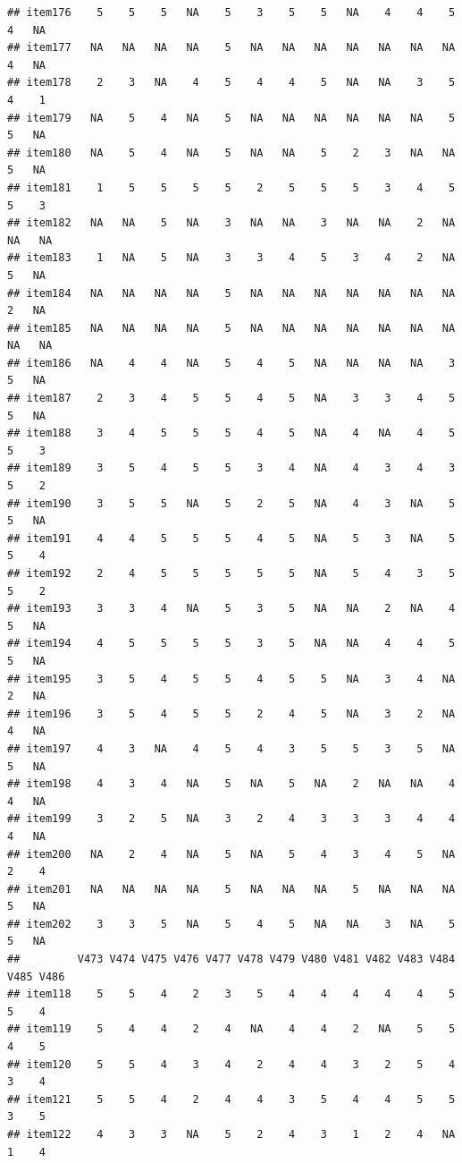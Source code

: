 \documentclass[
  man]{apa6}
\begin{document}
\begin{verbatim}
## item176    5    5    5   NA    5    3    5    5   NA    4    4    5    4   NA
## item177   NA   NA   NA   NA    5   NA   NA   NA   NA   NA   NA   NA    4   NA
## item178    2    3   NA    4    5    4    4    5   NA   NA    3    5    4    1
## item179   NA    5    4   NA    5   NA   NA   NA   NA   NA   NA    5    5   NA
## item180   NA    5    4   NA    5   NA   NA    5    2    3   NA   NA    5   NA
## item181    1    5    5    5    5    2    5    5    5    3    4    5    5    3
## item182   NA   NA    5   NA    3   NA   NA    3   NA   NA    2   NA   NA   NA
## item183    1   NA    5   NA    3    3    4    5    3    4    2   NA    5   NA
## item184   NA   NA   NA   NA    5   NA   NA   NA   NA   NA   NA   NA    2   NA
## item185   NA   NA   NA   NA    5   NA   NA   NA   NA   NA   NA   NA   NA   NA
## item186   NA    4    4   NA    5    4    5   NA   NA   NA   NA    3    5   NA
## item187    2    3    4    5    5    4    5   NA    3    3    4    5    5   NA
## item188    3    4    5    5    5    4    5   NA    4   NA    4    5    5    3
## item189    3    5    4    5    5    3    4   NA    4    3    4    3    5    2
## item190    3    5    5   NA    5    2    5   NA    4    3   NA    5    5   NA
## item191    4    4    5    5    5    4    5   NA    5    3   NA    5    5    4
## item192    2    4    5    5    5    5    5   NA    5    4    3    5    5    2
## item193    3    3    4   NA    5    3    5   NA   NA    2   NA    4    5   NA
## item194    4    5    5    5    5    3    5   NA   NA    4    4    5    5   NA
## item195    3    5    4    5    5    4    5    5   NA    3    4   NA    2   NA
## item196    3    5    4    5    5    2    4    5   NA    3    2   NA    4   NA
## item197    4    3   NA    4    5    4    3    5    5    3    5   NA    5   NA
## item198    4    3    4   NA    5   NA    5   NA    2   NA   NA    4    4   NA
## item199    3    2    5   NA    3    2    4    3    3    3    4    4    4   NA
## item200   NA    2    4   NA    5   NA    5    4    3    4    5   NA    2    4
## item201   NA   NA   NA   NA    5   NA   NA   NA    5   NA   NA   NA    5   NA
## item202    3    3    5   NA    5    4    5   NA   NA    3   NA    5    5   NA
##         V473 V474 V475 V476 V477 V478 V479 V480 V481 V482 V483 V484 V485 V486
## item118    5    5    4    2    3    5    4    4    4    4    4    5    5    4
## item119    5    4    4    2    4   NA    4    4    2   NA    5    5    4    5
## item120    5    5    4    3    4    2    4    4    3    2    5    4    3    4
## item121    5    5    4    2    4    4    3    5    4    4    5    5    3    5
## item122    4    3    3   NA    5    2    4    3    1    2    4   NA    1    4

\end{verbatim}
\end{document}
